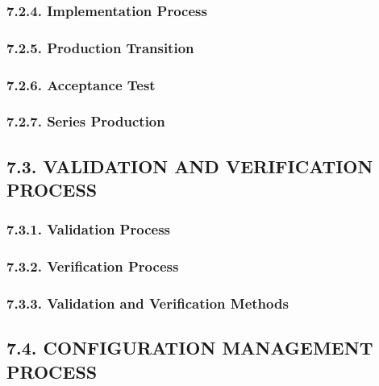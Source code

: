 \documentclass[
]{article}
\begin{document}
\hypertarget{implementation-process-1}{%
\subsubsection{7.2.4. Implementation
Process}\label{implementation-process-1}}

\hypertarget{production-transition-1}{%
\subsubsection{7.2.5. Production
Transition}\label{production-transition-1}}

\hypertarget{acceptance-test-1}{%
\subsubsection{7.2.6. Acceptance Test}\label{acceptance-test-1}}

\hypertarget{series-production-1}{%
\subsubsection{7.2.7. Series Production}\label{series-production-1}}

\hypertarget{validation-and-verification-process-1}{%
\subsection{7.3. VALIDATION AND VERIFICATION
PROCESS}\label{validation-and-verification-process-1}}

\hypertarget{validation-process-1}{%
\subsubsection{7.3.1. Validation Process}\label{validation-process-1}}

\hypertarget{verification-process-1}{%
\subsubsection{7.3.2. Verification
Process}\label{verification-process-1}}

\hypertarget{validation-and-verification-methods-1}{%
\subsubsection{7.3.3. Validation and Verification
Methods}\label{validation-and-verification-methods-1}}

\hypertarget{configuration-management-process-1}{%
\subsection{7.4. CONFIGURATION MANAGEMENT
PROCESS}\label{configuration-management-process-1}}
\end{document}
